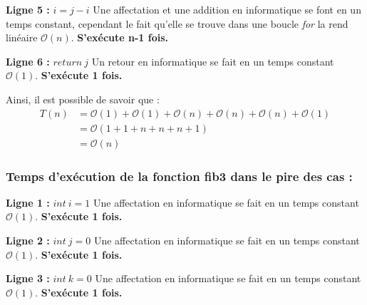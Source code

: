 \documentclass[12pt]{article}
\begin{document}
        \noindent \textbf{Ligne 5 :} \( i = j-i \) \newline
  	    Une affectation et une addition en informatique se font en un temps constant, \newline
        cependant le fait qu'elle se trouve dans une boucle \textit{for} la rend linéaire
        \( \mathcal{O}(n) \). \newline
		\textbf{S'exécute n-1 fois.} \newline

        \noindent \textbf{Ligne 6 :} \( return \: j \) \newline
  	    Un retour en informatique se fait en un temps constant
        \( \mathcal{O}(1) \). \newline
        \textbf{S'exécute 1 fois.} \newline

        \noindent Ainsi, il est possible de savoir que :
	    \begin{align*}
	       T(n) &= \mathcal{O}(1)+\mathcal{O}(1)+\mathcal{O}(n)+\mathcal{O}(n)+\mathcal{O}(n)+\mathcal{O}(1) \\
	   	   &= \mathcal{O}(1+1+n+n+n+1) \\
	       &= \mathcal{O}(n)
	    \end{align*}

	  \newpage

      \subsubsection*{Temps d'exécution de la fonction fib3 dans le pire des cas :}

  	    \noindent \textbf{Ligne 1 :} \( int \: i = 1 \) \newline
        Une affectation en informatique se fait en un temps constant
        \( \mathcal{O}(1) \). \newline
        \textbf{S'exécute 1 fois.} \newline

        \noindent \textbf{Ligne 2 :} \( int \: j = 0 \) \newline
        Une affectation en informatique se fait en un temps constant
        \( \mathcal{O}(1) \). \newline
        \textbf{S'exécute 1 fois.} \newline

        \noindent \textbf{Ligne 3 :} \( int \: k = 0 \) \newline
        Une affectation en informatique se fait en un temps constant
        \( \mathcal{O}(1) \). \newline
 		\textbf{S'exécute 1 fois.} \newline
\end{document}

